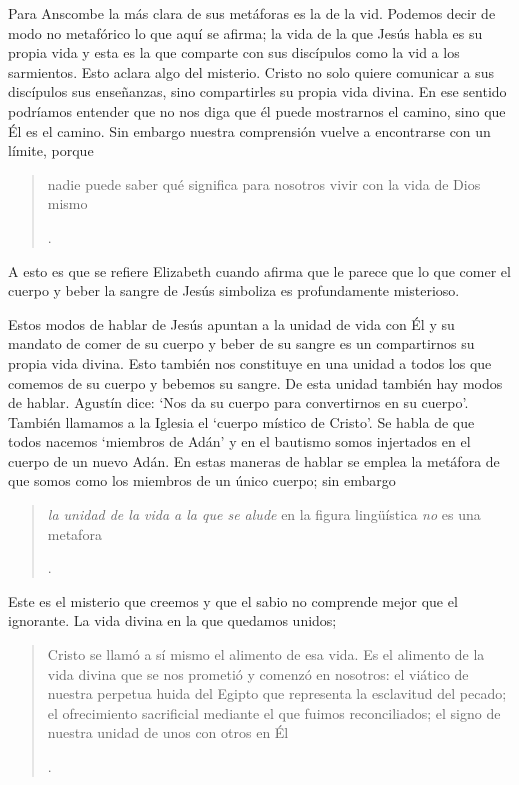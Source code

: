 Para Anscombe la más clara de sus metáforas es la de la vid. Podemos decir de modo no metafórico lo que aquí se afirma; la vida de la que Jesús habla es su propia vida y esta es la que comparte con sus discípulos como la vid a los sarmientos. Esto aclara algo del misterio. Cristo no solo quiere comunicar a sus discípulos sus enseñanzas, sino compartirles su propia vida divina. En ese sentido podríamos entender que no nos diga que él puede mostrarnos el camino, sino que Él es el camino. Sin embargo nuestra comprensión vuelve a encontrarse con un límite, porque \blockquote[{\Cite[93]{torralbaynubiola2005fayeh:ot}}.
]{nadie puede saber qué significa para nosotros vivir con la vida de Dios mismo}. A esto es que se refiere Elizabeth cuando afirma que le parece que lo que comer el cuerpo y beber la sangre de Jesús simboliza es profundamente misterioso.

Estos modos de hablar de Jesús apuntan a la unidad de vida con Él y su mandato de comer de su cuerpo y beber de su sangre es un compartirnos su propia vida divina. Esto también nos constituye en una unidad a todos los que comemos de su cuerpo y bebemos su sangre. De esta unidad también hay modos de hablar. Agustín dice: \enquote*{Nos da su cuerpo para convertirnos en su cuerpo}. También llamamos a la Iglesia el \enquote*{cuerpo místico de Cristo}. Se habla de que todos nacemos \enquote*{miembros de Adán} y en el bautismo somos injertados en el cuerpo de un nuevo Adán. En estas maneras de hablar se emplea la metáfora de que somos como los miembros de un único cuerpo; sin embargo \blockquote[{\Cite[94]{torralbaynubiola2005fayeh:ot}}.
]{\emph{la unidad de la vida a la que se alude} en la figura lingüística \emph{no} es una metafora}.

Este es el misterio que creemos y que el sabio no comprende mejor que el ignorante. La vida divina en la que quedamos unidos; \blockquote[{\Cite[94]{torralbaynubiola2005fayeh:ot}}.
]{Cristo se llamó a sí mismo el alimento de esa vida. Es el alimento de la vida divina que se nos prometió y comenzó en nosotros: el viático de nuestra perpetua huida del Egipto que representa la esclavitud del pecado; el ofrecimiento sacrificial mediante el que fuimos reconciliados; el signo de nuestra unidad de unos con otros en Él}.


